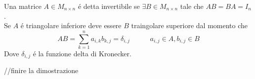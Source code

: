 Una matrice \( A \in M_{n \times n} \) \'e detta invertibile se \( \exists B \in M_{n \times n} \) tale che \( AB = BA = \mathit{I_n} \).
\\
Se \( A \) \'e triangolare inferiore deve essere \( B \) traingolare superiore dal momento che
\[
AB = \sum_{k=1}^n a_{i,k} b_{k,j} = \delta_{i,j} \hspace{35pt} a_{i,j} \in A, b_{i,j} \in B
\]
Dove \( \delta_{i,j} \) \'e la funzione delta di Kronecker. 

//finire la dimostrazione